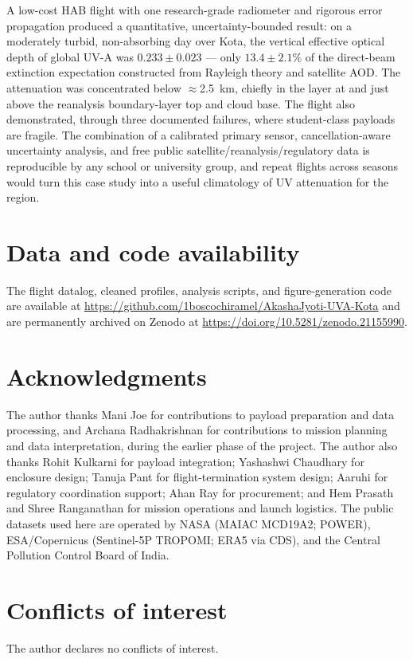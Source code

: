 \documentclass[11pt,a4paper]{article}
\begin{document}
A low-cost HAB flight with one research-grade radiometer and rigorous error propagation
produced a quantitative, uncertainty-bounded result: on a moderately turbid, non-absorbing
day over Kota, the vertical effective optical depth of global UV-A was
$0.233 \pm 0.023$ --- only $13.4 \pm 2.1$\% of the direct-beam extinction expectation
constructed from Rayleigh theory and satellite AOD. The attenuation was concentrated below
$\approx$2.5~km, chiefly in the layer at and just above the reanalysis boundary-layer top
and cloud base. The flight also
demonstrated, through three documented failures, where student-class payloads are fragile.
The combination of a calibrated primary sensor, cancellation-aware uncertainty analysis,
and free public satellite/reanalysis/regulatory data is reproducible by any school or
university group, and repeat flights across seasons would turn this case study into a
useful climatology of UV attenuation for the region.

\section*{Data and code availability}
The flight datalog, cleaned profiles, analysis scripts, and figure-generation code are
available at \url{https://github.com/1boscochiramel/AkashaJyoti-UVA-Kota} and are
permanently archived on Zenodo at \url{https://doi.org/10.5281/zenodo.21155990}.

\section*{Acknowledgments}
The author thanks Mani Joe for contributions to payload preparation and data processing,
and Archana Radhakrishnan for contributions to mission planning and data interpretation,
during the earlier phase of the project. The author also thanks Rohit Kulkarni for
payload integration; Yashashwi Chaudhary for enclosure design; Tanuja Pant for
flight-termination system design; Aaruhi for regulatory coordination support; Ahan Ray
for procurement; and Hem Prasath and Shree Ranganathan for mission operations and launch
logistics. The public datasets used here are operated by NASA (MAIAC MCD19A2; POWER),
ESA/Copernicus (Sentinel-5P TROPOMI; ERA5 via CDS), and the Central Pollution Control
Board of India.

\section*{Conflicts of interest}
The author declares no conflicts of interest.
\end{document}
